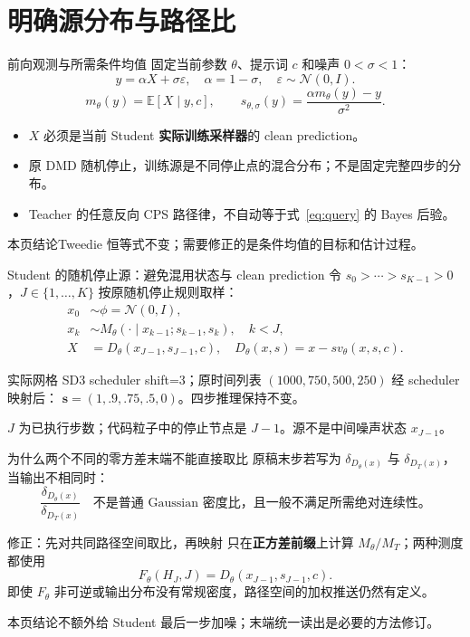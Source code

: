 \documentclass[10pt,aspectratio=169]{beamer}
\newcommand{\E}{\mathbb E}
\newcommand{\N}{\mathcal N}
\newcommand{\takeaway}[1]{\begin{exampleblock}{本页结论}\small #1\end{exampleblock}}
\begin{document}
\section{明确源分布与路径比}
\begin{frame}{前向观测与所需条件均值}
\small
固定当前参数 $\theta$、提示词 $c$ 和噪声 $0<\sigma<1$：
\begin{equation}\label{eq:query}
y=\alpha X+\sigma\varepsilon,\quad \alpha=1-\sigma,\quad \varepsilon\sim\N(0,I).
\end{equation}
\begin{equation}\label{eq:tweedie}
m_\theta(y)=\E[X\mid y,c],\qquad
s_{\theta,\sigma}(y)=\frac{\alpha m_\theta(y)-y}{\sigma^2}.
\end{equation}
\begin{itemize}\itemsep5pt
\item $X$ 必须是当前 Student \textbf{实际训练采样器}的 clean prediction。
\item 原 DMD 随机停止，训练源是不同停止点的混合分布；不是固定完整四步的分布。
\item Teacher 的任意反向 CPS 路径律，不自动等于式~\eqref{eq:query} 的 Bayes 后验。
\end{itemize}
\takeaway{Tweedie 恒等式不变；需要修正的是条件均值的目标和估计过程。}
\end{frame}

\begin{frame}{Student 的随机停止源：避免混用状态与 clean prediction}
\small
令 $s_0>\cdots>s_{K-1}>0$，$J\in\{1,\ldots,K\}$ 按原随机停止规则取样：
\begin{align}
x_0&\sim\phi=\N(0,I),\\
x_k&\sim M_\theta(\cdot\mid x_{k-1};s_{k-1},s_k),\quad k<J,\\
X&=D_\theta(x_{J-1},s_{J-1},c),\quad D_\theta(x,s)=x-sv_\theta(x,s,c).
\end{align}
\begin{block}{实际网格}
SD3 scheduler shift=3；原时间列表 $(1000,750,500,250)$ 经 scheduler 映射后：
$\boldsymbol s=(1,.9,.75,.5,0)$。四步推理保持不变。
\end{block}
$J$ 为已执行步数；代码粒子中的停止节点是 $J-1$。源不是中间噪声状态 $x_{J-1}$。
\end{frame}

\begin{frame}{为什么两个不同的零方差末端不能直接取比}
\small
原稿末步若写为 $\delta_{D_\theta(x)}$ 与 $\delta_{D_T(x)}$，当输出不相同时：
\begin{equation}
\frac{\delta_{D_\theta(x)}}{\delta_{D_T(x)}}
\quad\text{不是普通 Gaussian 密度比，且一般不满足所需绝对连续性。}
\end{equation}
\begin{block}{修正：先对共同路径空间取比，再映射}
只在\textbf{正方差前缀}上计算 $M_\theta/M_T$；两种测度都使用
\begin{equation}
F_\theta(H_J,J)=D_\theta(x_{J-1},s_{J-1},c).
\end{equation}
即使 $F_\theta$ 非可逆或输出分布没有常规密度，路径空间的加权推送仍然有定义。
\end{block}
\takeaway{不额外给 Student 最后一步加噪；末端统一读出是必要的方法修订。}
\end{frame}
\end{document}

